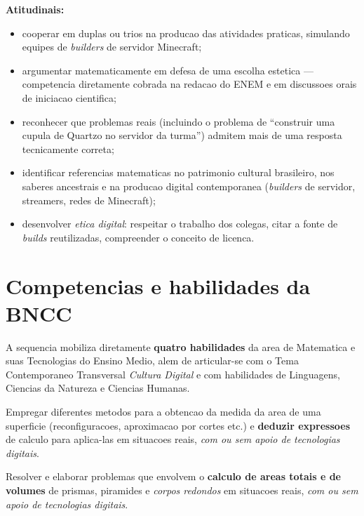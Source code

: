 \documentclass[12pt,a4paper]{scrartcl}
\newcommand{\acc}[1]{\textcolor{accent}{\textbf{#1}}}
\begin{document}
\textbf{Atitudinais:}
\begin{itemize}[leftmargin=1.3em,itemsep=0.2em,topsep=0.3em]
  \item cooperar em duplas ou trios na producao das atividades praticas, simulando equipes de \emph{builders} de servidor Minecraft;
  \item argumentar matematicamente em defesa de uma escolha estetica --- competencia diretamente cobrada na redacao do ENEM e em discussoes orais de iniciacao cientifica;
  \item reconhecer que problemas reais (incluindo o problema de \enquote{construir uma cupula de Quartzo no servidor da turma}) admitem mais de uma resposta tecnicamente correta;
  \item identificar referencias matematicas no patrimonio cultural brasileiro, nos saberes ancestrais e na producao digital contemporanea (\emph{builders} de servidor, streamers, redes de Minecraft);
  \item desenvolver \emph{etica digital}: respeitar o trabalho dos colegas, citar a fonte de \emph{builds} reutilizadas, compreender o conceito de licenca.
\end{itemize}

\section{Competencias e habilidades da BNCC}\label{sec:bncc}

A sequencia mobiliza diretamente \acc{quatro habilidades} da area de Matematica e suas Tecnologias do Ensino Medio, alem de articular-se com o Tema Contemporaneo Transversal \emph{Cultura Digital} e com habilidades de Linguagens, Ciencias da Natureza e Ciencias Humanas.

\begin{habilidade}[EM13MAT307]
Empregar diferentes metodos para a obtencao da medida da area de uma superficie (reconfiguracoes, aproximacao por cortes etc.) e \acc{deduzir expressoes} de calculo para aplica-las em situacoes reais, \emph{com ou sem apoio de tecnologias digitais}.
\end{habilidade}

\begin{habilidade}[EM13MAT309]
Resolver e elaborar problemas que envolvem o \acc{calculo de areas totais e de volumes} de prismas, piramides e \emph{corpos redondos} em situacoes reais, \emph{com ou sem apoio de tecnologias digitais}.
\end{habilidade}
\end{document}
